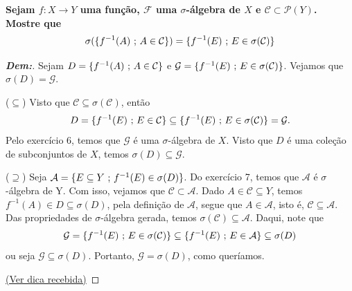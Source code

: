 \biglinend
\newpage
{}
\bigline 
\textbf{Sejam $f: X \rightarrow Y$ uma função, $\mathcal F$ uma $\sigma$-álgebra de $X$ e 
$\mathcal C \subset \mathcal P(Y)$. Mostre que 
\begin{align*}
  \sigma(\{f^{-1}(A)\text{ ; }  A \in \mathcal C\}) = \{f^{-1}(E)\text{ ; }  E \in \sigma(\mathcal C)\}
\end{align*}
}
\begin{proof}[\textbf{Dem:}] 
  Sejam $D = \{f^{-1}(A) \text{ ; }  A \in \mathcal C\}$ e $\mathcal G = \{f^{-1}(E)\text{ ; }  E \in \sigma(\mathcal C)\}$.
  Vejamos que $\sigma(D) = \mathcal G$.
  \vspace{3mm}

  ($\subseteq$) Visto que $\mathcal C \subseteq \sigma(\mathcal C)$, então 
  $$D = \{f^{-1}(E)\text{ ; }  E \in \mathcal C\} \subseteq \{f^{-1}(E)\text{ ; }  E \in \sigma(\mathcal C)\} = \mathcal G.$$
  Pelo exercício 6, temos que $\mathcal G$ é uma $\sigma$-álgebra de $X$. Visto que $D$ é uma 
  coleção de subconjuntos de $X$, temos $\sigma(D) \subseteq \mathcal G$. 

  ($\supseteq$) Seja $\mathcal A = \{E \subseteq Y\text{ ; }  f^{-1}(E) \in \sigma(D)\}$. Do exercício 7, temos que 
  $\mathcal A$ é $\sigma$-álgebra de Y. Com isso, vejamos que $\mathcal C \subset \mathcal A$. 
  Dado $A \in \mathcal C \subseteq Y$, temos $f^{-1}(A) \in D \subseteq \sigma(D)$, pela definição de $\mathcal A$, 
  segue que $A \in \mathcal A$, isto é, $\mathcal C \subseteq \mathcal A$. Das propriedades de $\sigma$-álgebra gerada, 
  temos $\sigma(\mathcal C) \subseteq \mathcal A$. Daqui, note que 
  \begin{align*}
    \mathcal G = \{f^{-1}(E)\text{ ; }  E \in \sigma(\mathcal C)\} \subseteq 
    \{f^{-1}(E)\text{ ; }  E \in \mathcal A\} \subseteq \sigma(D)
  \end{align*}
  ou seja $\mathcal G \subseteq \sigma(D)$. Portanto, $\mathcal G = \sigma(D)$, como queríamos.

  \href{https://math.stackexchange.com/questions/1620852/how-to-proof-that-
  f-1-sigma-mathcal-c-subseteq-sigmaf-1-mathcal-c?noredirect=1&lq=1}{(Ver dica recebida)}
\end{proof}

